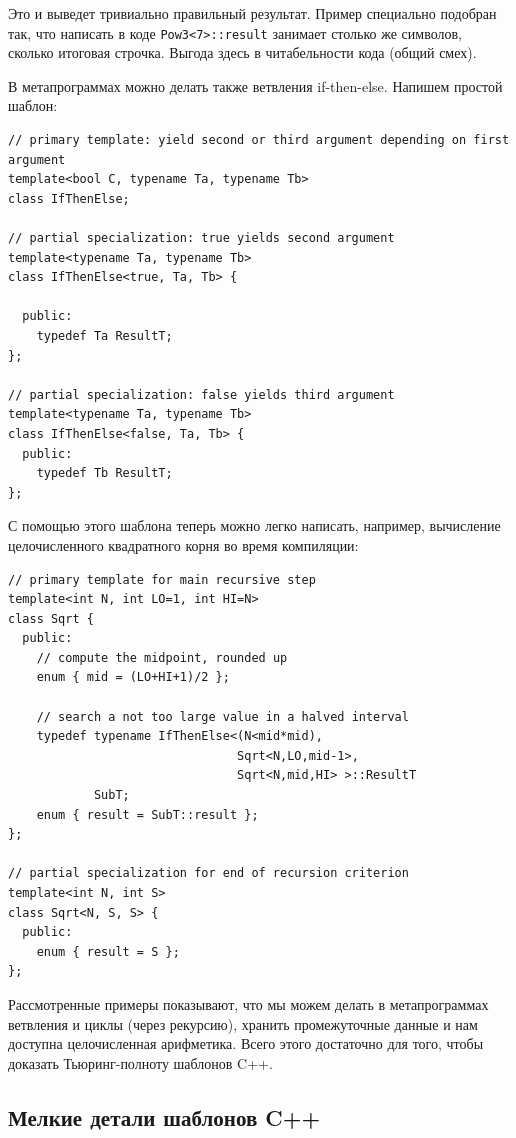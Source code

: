 \documentclass[a4paper,12pt,oneside]{article}
\begin{document}
Это и выведет тривиально правильный результат. Пример специально подобран так, что написать в коде \lstinline!Pow3<7>::result! занимает столько же символов, сколько итоговая строчка. Выгода здесь в читабельности кода (общий смех). 

В метапрограммах можно делать также ветвления if-then-else. Напишем простой шаблон:

\begin{lstlisting}
// primary template: yield second or third argument depending on first argument 
template<bool C, typename Ta, typename Tb> 
class IfThenElse; 

// partial specialization: true yields second argument 
template<typename Ta, typename Tb> 
class IfThenElse<true, Ta, Tb> { 

  public: 
    typedef Ta ResultT; 
}; 

// partial specialization: false yields third argument 
template<typename Ta, typename Tb> 
class IfThenElse<false, Ta, Tb> { 
  public: 
    typedef Tb ResultT; 
}; 
\end{lstlisting}

С помощью этого шаблона теперь можно легко написать, например, вычисление целочисленного квадратного корня во время компиляции:

\begin{lstlisting}
// primary template for main recursive step 
template<int N, int LO=1, int HI=N> 
class Sqrt { 
  public: 
    // compute the midpoint, rounded up 
    enum { mid = (LO+HI+1)/2 }; 

    // search a not too large value in a halved interval 
    typedef typename IfThenElse<(N<mid*mid), 
                                Sqrt<N,LO,mid-1>, 
                                Sqrt<N,mid,HI> >::ResultT 
            SubT; 
    enum { result = SubT::result }; 
}; 

// partial specialization for end of recursion criterion 
template<int N, int S> 
class Sqrt<N, S, S> { 
  public: 
    enum { result = S }; 
}; 
\end{lstlisting}

Рассмотренные примеры показывают, что мы можем делать в метапрограммах ветвления и циклы (через рекурсию), хранить промежуточные данные и нам доступна целочисленная арифметика. Всего этого достаточно для того, чтобы доказать Тьюринг-полноту шаблонов C++.

\subsection{Мелкие детали шаблонов C++}
\end{document}
